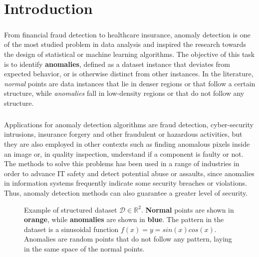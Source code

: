\chapter{Introduction}
\label{ch:introduction}
\paragraph{}
From financial fraud detection to healthcare insurance, anomaly detection is one of the most studied problem in data analysis and inspired the research towards the design of statistical or machine learning algorithms. \newline
The objective of this task is to identify \textbf{anomalies}, defined as a dataset instance that deviates from expected behavior, or is otherwise distinct from other instances. \newline
In the literature, \textit{normal} points are data instances that lie in denser regions or that follow a certain structure, while \textit{anomalies} fall in low-density regions or that do not follow any structure.

\paragraph{}
Applications for anomaly detection algorithms are fraud detection, cyber-security intrusions, insurance forgery and other fraudulent or hazardous activities, but they are also employed in other contexts such as finding anomalous pixels inside an image or, in quality inspection, understand if a component is faulty or not. \newline
The methods to solve this problems has been used in a range of industries in order to advance IT safety and detect potential abuse or assaults, since anomalies in information systems frequently indicate some security breaches or violations. Thus, anomaly detection methods can also guarantee a greater level of security. 

\begin{figure}[tb]
  \begin{center}
    
  \end{center}
  \caption{Example of structured dataset $\mathcal{D} \in \mathbb{R}^2$. \textbf{Normal} points are shown in \textbf{orange}, while \textbf{anomalies} are shown in \textbf{blue}. The pattern in the dataset is a sinusoidal function $f(x) = y = sin(x)cos(x)$. Anomalies are random points that do not follow any pattern, laying in the same space of the normal points.}
\label{fig:sinusoidal}
\end{figure}

